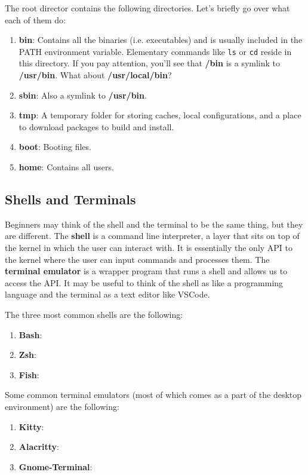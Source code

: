 \documentclass{article}
\theoremstyle{definition}
\begin{document}
    The root director contains the following directories. Let's briefly go over what each of them do: 
    \begin{enumerate}
      \item \textbf{bin}: Contains all the binaries (i.e. executables) and is usually included in the PATH environment variable. Elementary commands like \texttt{ls} or \texttt{cd} reside in this directory. If you pay attention, you'll see that \textbf{/bin} is a symlink to \textbf{/usr/bin}. What about \textbf{/usr/local/bin}? 
      \item \textbf{sbin}: Also a symlink to \textbf{/usr/bin}.   
      \item \textbf{tmp}: A temporary folder for storing caches, local configurations, and a place to download packages to build and install. 
      \item \textbf{boot}: Booting files. 
      \item \textbf{home}: Contains all users. 
    \end{enumerate}
  
  \subsection{Shells and Terminals}

    Beginners may think of the shell and the terminal to be the same thing, but they are different. The \textbf{shell} is a command line interpreter, a layer that sits on top of the kernel in which the user can interact with. It is essentially the only API to the kernel where the user can input commands and processes them. The \textbf{terminal emulator} is a wrapper program that runs a shell and allows us to access the API. It may be useful to think of the shell as like a programming language and the terminal as a text editor like VSCode. 

    The three most common shells are the following: 
    \begin{enumerate}
      \item \textbf{Bash}: 
      \item \textbf{Zsh}: 
      \item \textbf{Fish}:  
    \end{enumerate}

    Some common terminal emulators (most of which comes as a part of the desktop environment) are the following: 
    \begin{enumerate}
      \item \textbf{Kitty}: 
      \item \textbf{Alacritty}: 
      \item \textbf{Gnome-Terminal}: 
    \end{enumerate}
\end{document}
